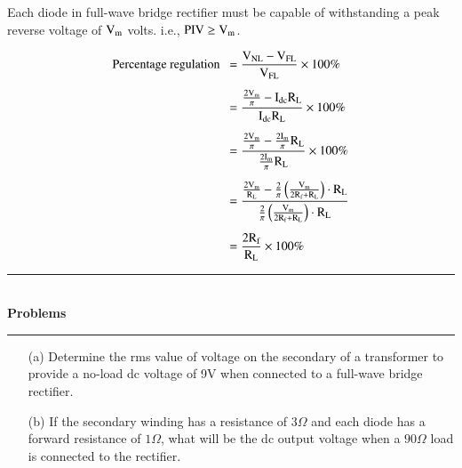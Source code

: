 Each diode in full-wave bridge rectifier must be capable of withstanding a peak reverse voltage of $\textrm{V}_{\textrm{m}}$ volts. i.e., $\text{PIV}\geq \textrm{V}_{\textrm{m}}$.

\begin{align}
\text{Percentage regulation~ } &= \frac{\textrm{V}_{\text{NL}}-\textrm{V}_{\text{FL}}}{\textrm{V}_{\text{FL}}}\times 100\%\notag\\[5pt]
&= \dfrac{\frac{2\textrm{V}_{\textrm{m}}}{\pi}-\textrm{I}_{\text{dc}}\textrm{R}_{\textrm{L}}}{\textrm{I}_{\text{dc}}\textrm{R}_{\textrm{L}}}\times 100\%\notag\\[5pt]
&= \dfrac{\frac{2\textrm{V}_{\textrm{m}}}{\pi}-\frac{2\textrm{I}_{\textrm{m}}}{\pi}\textrm{R}_{\textrm{L}}}{\frac{2\textrm{I}_{\textrm{m}}}{\pi}\textrm{R}_{\textrm{L}}}\times 100\%\notag\\[5pt]
&=\dfrac{\frac{2\textrm{V}_{\textrm{m}}}{\textrm{R}_{\textrm{L}}}-\frac{2}{\pi}\left(\frac{\textrm{V}_{\textrm{m}}}{2\textrm{R}_{\textrm{f}}+\textrm{R}_{\textrm{L}}}\right)\cdot \textrm{R}_{\textrm{L}}}{\frac{2}{\pi}\left(\frac{\textrm{V}_{\textrm{m}}}{2\textrm{R}_{\textrm{f}}+\textrm{R}_{\textrm{L}}}\right)\cdot \textrm{R}_{\textrm{L}}}\notag\\[5pt]
&= \frac{2\textrm{R}_{\textrm{f}}}{\textrm{R}_{\textrm{L}}}\times 100\%\label{eq1.29}
\end{align}

\medskip
\begin{center}
\rule{4cm}{1pt}\\
{\bf\Large Problems}\\[-3pt]
\rule{4cm}{1pt}
\end{center}

\begin{problem}\label{prob1.14}
\begin{itemize}
\item[(a)] Determine the rms value of voltage on the secondary of a transformer to provide a no-load dc voltage of 9V when connected to a full-wave bridge rectifier.

\item[(b)] If the secondary winding has a resistance of $3\Omega$ and each diode has a forward resistance of $1\Omega$, what will be the dc output voltage when a $90\Omega$ load is connected to the rectifier.
\end{itemize}
\end{problem}

